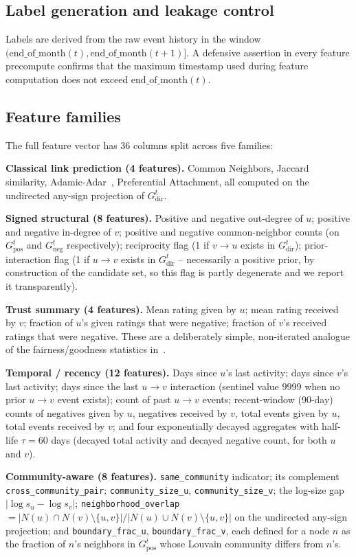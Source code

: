 \documentclass[conference]{IEEEtran}
\newcommand{\code}[1]{\texttt{#1}}
\begin{document}
\subsection{Label generation and leakage control}
Labels are derived from the raw event history in the window
$(\mathrm{end\_of\_month}(t), \mathrm{end\_of\_month}(t{+}1)]$. A
defensive assertion in every feature precompute confirms that the
maximum timestamp used during feature computation does not exceed
$\mathrm{end\_of\_month}(t)$.

\subsection{Feature families}
The full feature vector has 36 columns split across five families:

\textbf{Classical link prediction (4 features).} Common Neighbors,
Jaccard similarity, Adamic-Adar~\cite{adamic2003}, Preferential
Attachment, all computed on the undirected any-sign projection of
$G^t_{\mathrm{dir}}$.

\textbf{Signed structural (8 features).} Positive and negative
out-degree of $u$; positive and negative in-degree of $v$; positive
and negative common-neighbor counts (on $G^t_{\mathrm{pos}}$ and
$G^t_{\mathrm{neg}}$ respectively); reciprocity flag (1 if $v \to u$
exists in $G^t_{\mathrm{dir}}$); prior-interaction flag (1 if
$u \to v$ exists in $G^t_{\mathrm{dir}}$ -- necessarily a positive
prior, by construction of the candidate set, so this flag is partly
degenerate and we report it transparently).

\textbf{Trust summary (4 features).} Mean rating given by $u$; mean
rating received by $v$; fraction of $u$'s given ratings that were
negative; fraction of $v$'s received ratings that were negative.
These are a deliberately simple, non-iterated analogue of the
fairness/goodness statistics in~\cite{kumar2016}.

\textbf{Temporal / recency (12 features).} Days since $u$'s last
activity; days since $v$'s last activity; days since the last
$u \to v$ interaction (sentinel value $9999$ when no prior $u \to v$
event exists); count of past $u \to v$ events; recent-window (90-day)
counts of negatives given by $u$, negatives received by $v$, total
events given by $u$, total events received by $v$; and four
exponentially decayed aggregates with half-life $\tau = 60$ days
(decayed total activity and decayed negative count, for both $u$ and
$v$).

\textbf{Community-aware (8 features).} \code{same\_community}
indicator; its complement \code{cross\_community\_pair};
\code{community\_size\_u}, \code{community\_size\_v}; the log-size
gap $|\log s_u - \log s_v|$;
\code{neighborhood\_overlap} $= |N(u) \cap N(v) \setminus \{u,v\}|
/ |N(u) \cup N(v) \setminus \{u,v\}|$ on the undirected any-sign
projection; and \code{boundary\_frac\_u}, \code{boundary\_frac\_v},
each defined for a node $n$ as the fraction of $n$'s neighbors in
$G^t_{\mathrm{pos}}$ whose Louvain community differs from $n$'s.
\end{document}
